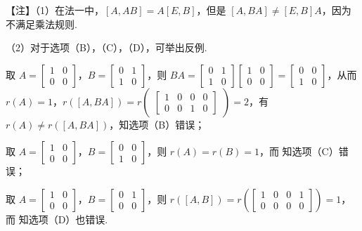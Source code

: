 \begin{fnote}
【注】（1）在法一中，$[A,AB]=A[E,B]$，但是 $[A,BA]\neq[E,B]A$，因为不满足乘法规则.

（2）对于选项（B），（C），（D），可举出反例.

取 $A=\begin{bmatrix}1 & 0\\ 0 & 0\end{bmatrix}$，$B=\begin{bmatrix}0 & 1\\ 1 & 0\end{bmatrix}$，则 $BA=\begin{bmatrix}0 & 1\\ 1 & 0\end{bmatrix}\begin{bmatrix}1 & 0\\ 0 & 0\end{bmatrix}=\begin{bmatrix}0 & 0\\ 1 & 0\end{bmatrix}$，从而 $r(A)=1$，$r([A,BA])=r\begin{pmatrix}\begin{bmatrix}1 & 0 & 0 & 0\\ 0 & 0 & 1 & 0\end{bmatrix}\end{pmatrix}=2$，有 $r(A)\neq r([A,BA])$，知选项（B）错误；
\end{fnote}

\begin{fnote}
取 $A=\begin{bmatrix}1 & 0\\ 0 & 0\end{bmatrix}$，$B=\begin{bmatrix}0 & 0\\ 1 & 0\end{bmatrix}$，则 $r(A)=r(B)=1$，而
知选项（C）错误；

取 $A=\begin{bmatrix}1 & 0\\ 0 & 0\end{bmatrix}$，$B=\begin{bmatrix}0 & 1\\ 0 & 0\end{bmatrix}$，则 $r([A,B])=r\left(\begin{bmatrix}1 & 0 & 0 & 1\\ 0 & 0 & 0 & 0\end{bmatrix}\right)=1$，而
知选项（D）也错误.
\end{fnote}

